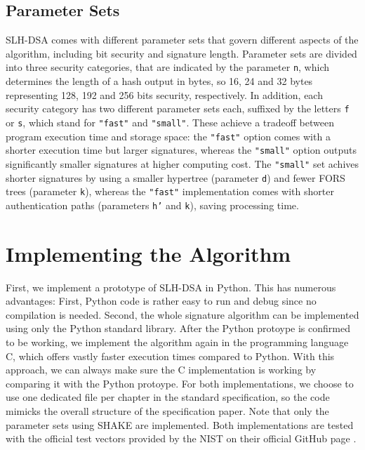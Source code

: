 \documentclass[journal=tosc,notanonymous]{iacrtrans}
\begin{document}
\subsection{Parameter Sets}

SLH-DSA comes with different parameter sets that govern different aspects of the algorithm, including bit security and signature length.
Parameter sets are divided into three security categories, that are indicated by the parameter \texttt{n}, which determines the length of a hash output in bytes, so 16, 24 and 32 bytes representing 128, 192 and 256 bits security, respectively.
In addition, each security category has two different parameter sets each, suffixed by the letters \texttt{f} or \texttt{s}, which stand for \texttt{"fast"} and \texttt{"small"}.
These achieve a tradeoff between program execution time and storage space: the \texttt{"fast"} option comes with a shorter execution time but larger signatures, whereas the \texttt{"small"} option outputs significantly smaller signatures at higher computing cost.
The \texttt{"small"} set achives shorter signatures by using a smaller hypertree (parameter \texttt{d}) and fewer FORS trees (parameter \texttt{k}), whereas the \texttt{"fast"} implementation comes with shorter authentication paths (parameters \texttt{h'} and \texttt{k}), saving processing time.


\section{Implementing the Algorithm}

First, we implement a prototype of SLH-DSA in Python.
This has numerous advantages: First, Python code is rather easy to run and debug since no compilation is needed.
Second, the whole signature algorithm can be implemented using only the Python standard library.
After the Python protoype is confirmed to be working, we implement the algorithm again in the programming language C, which offers vastly faster execution times compared to Python.
With this approach, we can always make sure the C implementation is working by comparing it with the Python protoype.
For both implementations, we choose to use one dedicated file per chapter in the standard specification, so the code mimicks the overall structure of the specification paper.
Note that only the parameter sets using SHAKE are implemented.
Both implementations are tested with the official test vectors provided by the NIST on their official GitHub page \cite{usnistgov-2024}.
\end{document}
